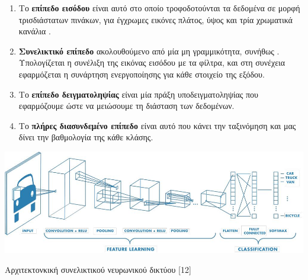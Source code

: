\begin{enumerate}
    \item Το \textbf{επίπεδο εισόδου} είναι αυτό στο οποίο τροφοδοτούνται τα δεδομένα σε μορφή τρισδιάστατων πινάκων, για έγχρωμες εικόνες πλάτος, ύψος και τρία χρωματικά κανάλια .
    \item \textbf{Συνελικτικό επίπεδο}  ακολουθούμενο από μία μη γραμμικότητα, συνήθως . Υπολογίζεται η συνέλιξη της εικόνας εισόδου με τα φίλτρα, και στη συνέχεια εφαρμόζεται η συνάρτηση ενεργοποίησης  για κάθε στοιχείο της εξόδου.
    \item Tο \textbf{επίπεδο δειγματοληψίας}  είναι μία πράξη υποδειγματοληψίας που εφαρμόζουμε ώστε να μειώσουμε τη διάσταση των δεδομένων.
    \item Το \textbf{πλήρες διασυνδεμένο επίπεδο}  είναι αυτό που κάνει την ταξινόμηση και μας δίνει την βαθμολογία της κάθε κλάσης.
\end{enumerate}

\begin{Illustration}[!ht] \centering
\includegraphics[width=\textwidth]{images/image015.jpg} \caption{Αρχιτεκτονκική συνελικτικού νευρωνικού δικτύου  [12]} 
\label{fig:}
\end{Illustration} 
